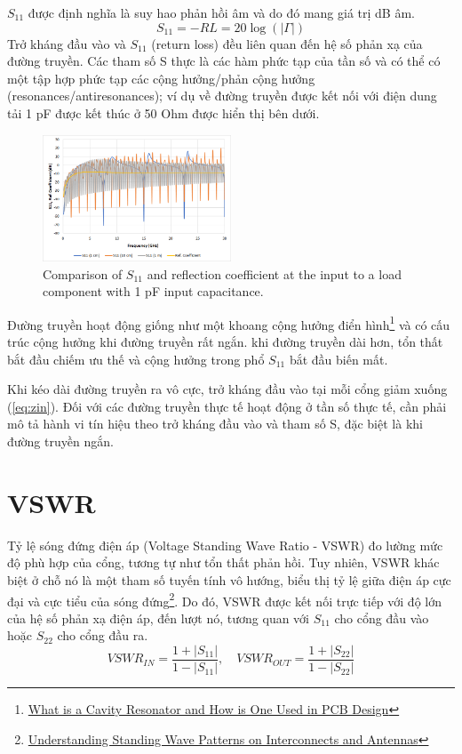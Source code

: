         $S_{11}$ được định nghĩa là suy hao phản hồi âm và do đó mang giá trị dB âm.
        $$S_{11} = -RL = 20\log\left(\left|\Gamma\right|\right)$$
        Trở kháng đầu vào và $S_{11}$ (return loss) đều liên quan đến hệ số phản xạ của đường truyền. Các tham số S thực là các hàm phức tạp của tần số và có thể có một tập hợp phức tạp các cộng hưởng/phản cộng hưởng (resonances/antiresonances); ví dụ về đường truyền được kết nối với điện dung tải 1 pF được kết thúc ở 50 Ohm được hiển thị bên dưới.\par
        \begin{figure}[h]
            \centering
            \includegraphics[width=0.5\textwidth]{figures/1pf_input.png}
            \caption{Comparison of $S_{11}$ and reflection coefficient at the input to a load component with 1 pF input capacitance.}
        \end{figure}

        Đường truyền hoạt động giống như một khoang cộng hưởng điển hình\footnote{\href{https://resources.pcb.cadence.com/blog/2019-what-is-a-cavity-resonator-and-how-is-one-used-in-pcb-design}{\color{blue}What is a Cavity Resonator and How is One Used in PCB Design}} và có cấu trúc cộng hưởng khi đường truyền rất ngắn. khi đường truyền dài hơn, tổn thất bắt đầu chiếm ưu thế và cộng hưởng trong phổ $S_{11}$ bắt đầu biến mất.\cite{cadence2021transmission}\par
        Khi kéo dài đường truyền ra vô cực, trở kháng đầu vào tại mỗi cổng giảm xuống (\autoref{eq:zin}). Đối với các đường truyền thực tế hoạt động ở tần số thực tế, cần phải mô tả hành vi tín hiệu theo trở kháng đầu vào và tham số S, đặc biệt là khi đường truyền ngắn.\cite{cadence2021transmission}\par

    \section{VSWR}
        Tỷ lệ sóng đứng điện áp (Voltage Standing Wave Ratio - VSWR) đo lường mức độ phù hợp của cổng, 
        tương tự như tổn thất phản hồi. Tuy nhiên, VSWR khác biệt ở chỗ nó là một tham số tuyến tính vô hướng, 
        biểu thị tỷ lệ giữa điện áp cực đại và cực tiểu của sóng đứng\footnote{\href{https://resources.pcb.cadence.com/blog/2022-understanding-standing-wave-patterns-on-interconnects-and-antennas}{\color{blue}Understanding Standing Wave Patterns on Interconnects and Antennas}}. 
        Do đó, VSWR được kết nối trực tiếp với độ lớn của hệ số phản xạ điện áp, 
        đến lượt nó, tương quan với $S_{11}$ cho cổng đầu vào hoặc $S_{22}$ cho cổng đầu ra.
        \begin{equation}
            {VSWR}_{IN} = \frac{1 + |S_{11}|}{1 - |S_{11}|}, \quad {VSWR}_{OUT} = \frac{1 + |S_{22}|}{1 - |S_{22}|}
        \end{equation}